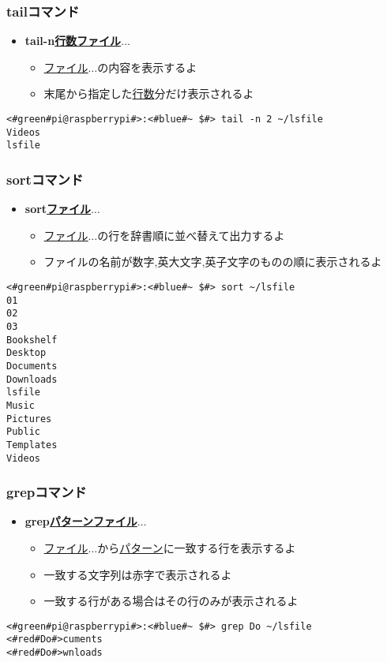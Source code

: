 \begin{frame}[fragile]
    \frametitle{tailコマンド}
    \begin{itemize}
        \item {\bf tail\textvisiblespace -n\textvisiblespace\underline{行数}\textvisiblespace\underline{ファイル}$\ldots$}
        \begin{itemize}
            \small
            \item[] \underline{ファイル}$\ldots$の内容を表示するよ
            \item[] 末尾から指定した\underline{行数}分だけ表示されるよ
        \end{itemize}
    \end{itemize}
    \begin{lstlisting}[title=tailコマンドの実行例, label=tail_example]
<#green#pi@raspberrypi#>:<#blue#~ $#> tail -n 2 ~/lsfile
Videos
lsfile
    \end{lstlisting}
\end{frame}

\begin{frame}[fragile]
    \frametitle{sortコマンド}
    \begin{itemize}
        \item {\bf sort\textvisiblespace\underline{ファイル}$\ldots$}
        \begin{itemize}
            \small
            \item[] \underline{ファイル}$\ldots$の行を辞書順に並べ替えて出力するよ
            \item[] ファイルの名前が数字,英大文字,英子文字のものの順に表示されるよ
    \end{itemize}
\end{itemize}
\begin{lstlisting}[title=sortコマンドの実行例, label=sort_example]
<#green#pi@raspberrypi#>:<#blue#~ $#> sort ~/lsfile
01
02
03
Bookshelf
Desktop
Documents
Downloads
lsfile
Music
Pictures
Public
Templates
Videos
    \end{lstlisting}
\end{frame}

\begin{frame}[fragile]
    \frametitle{grepコマンド}
    \begin{itemize}
        \item {\bf grep\textvisiblespace\underline{パターン}\textvisiblespace\underline{ファイル}$\ldots$}
        \begin{itemize}
            \small
            \item[] \underline{ファイル}$\ldots$から\underline{パターン}に一致する行を表示するよ
            \item[] 一致する文字列は赤字で表示されるよ
            \item[] 一致する行がある場合はその行のみが表示されるよ
        \end{itemize}
    \end{itemize}
    \begin{lstlisting}[title=grepコマンドの実行例, label=grep_example]
<#green#pi@raspberrypi#>:<#blue#~ $#> grep Do ~/lsfile
<#red#Do#>cuments
<#red#Do#>wnloads
    \end{lstlisting}
\end{frame}

